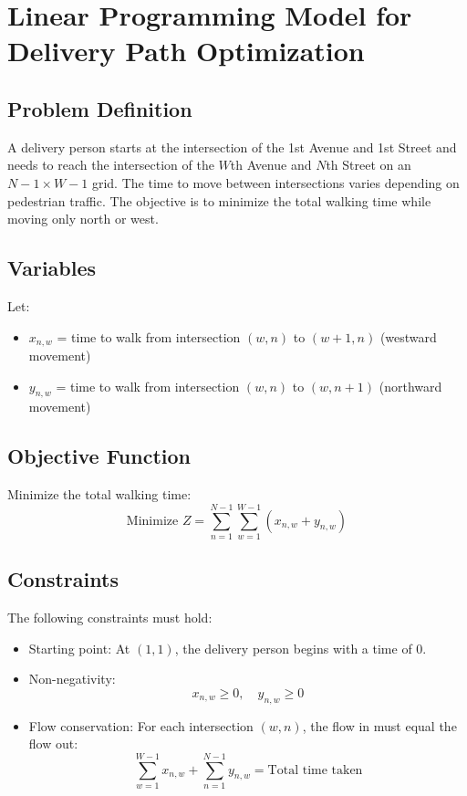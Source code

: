\documentclass{article}
\begin{document}
\section*{Linear Programming Model for Delivery Path Optimization}

\subsection*{Problem Definition}
A delivery person starts at the intersection of the 1st Avenue and 1st Street and needs to reach the intersection of the $W$th Avenue and $N$th Street on an $N-1 \times W-1$ grid. The time to move between intersections varies depending on pedestrian traffic. The objective is to minimize the total walking time while moving only north or west.

\subsection*{Variables}
Let:
\begin{itemize}
    \item $x_{n,w}$ = time to walk from intersection $(w,n)$ to $(w+1,n)$ (westward movement)
    \item $y_{n,w}$ = time to walk from intersection $(w,n)$ to $(w,n+1)$ (northward movement)
\end{itemize}

\subsection*{Objective Function}
Minimize the total walking time:
\[
\text{Minimize } Z = \sum_{n=1}^{N-1} \sum_{w=1}^{W-1} \left( x_{n,w} + y_{n,w} \right)
\]

\subsection*{Constraints}
The following constraints must hold:
\begin{itemize}
    \item Starting point: At $(1,1)$, the delivery person begins with a time of 0.
    \item Non-negativity: 
    \[
    x_{n,w} \geq 0, \quad y_{n,w} \geq 0
    \]
    \item Flow conservation: For each intersection $(w,n)$, the flow in must equal the flow out:
    \[
    \sum_{w=1}^{W-1} x_{n,w} + \sum_{n=1}^{N-1} y_{n,w} = \text{Total time taken}
    \]
\end{itemize}
\end{document}
